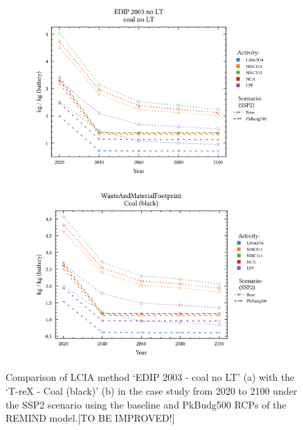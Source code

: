 \begin{figure}[H]
    \centering
    \begin{subfigure}[b]{0.8\linewidth}
        \includegraphics[width=\linewidth]{figures/comparison_methods2.png}
        \caption{}\label{fig:comparison_methods_a}
    \end{subfigure}

    \begin{subfigure}[b]{0.8\linewidth}
        \includegraphics[width=\linewidth]{figures/comparison_methods1.png}
        \caption{}\label{fig:comparison_methods_b}
    \end{subfigure}
    \caption{Comparison of LCIA method `EDIP 2003 - coal no LT' (a) with the `T-reX - Coal (black)' (b) in the case study from 2020 to 2100 under the SSP2 scenario using the baseline and PkBudg500 RCPs of the REMIND model.[TO BE IMPROVED!]}\label{fig:comparison_methods}
\end{figure}

